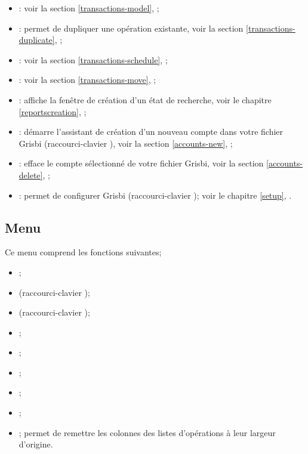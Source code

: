 \begin{itemize}	
\item {}: voir la section \vref{transactions-model}, ;
\item {}: permet de dupliquer une opération existante, voir la section \vref{transactions-duplicate}, ;
\item {}: voir la section \vref{transactions-schedule}, ;
\item {}: voir la section \vref{transactions-move}, ;
\item {}: affiche la fenêtre de	création d'un état de recherche, voir le chapitre \vref{reportscreation}, ;
\item {}: démarre l'assistant de	création d'un nouveau compte dans votre fichier Grisbi (raccourci-clavier ), voir la section \vref{accounts-new}, ;
\item {}: efface le compte sélectionné de votre fichier Grisbi, voir la section \vref{accounts-delete}, ;
\item {}: permet de configurer Grisbi (raccourci-clavier ); voir le chapitre \vref{setup}, .
\end{itemize}


\subsection{Menu \label{home-menus-display}}

Ce menu comprend les fonctions suivantes; 
\begin{itemize}
	 \item {}; 
	 \item {} (raccourci-clavier );
	 \item {} (raccourci-clavier );
	 \item {};
	 \item {};
	 \item {};
	 \item {};
	 \item {};
	 \item {}; permet de remettre les colonnes des listes d'opérations à leur largeur d'origine.
\end{itemize}


